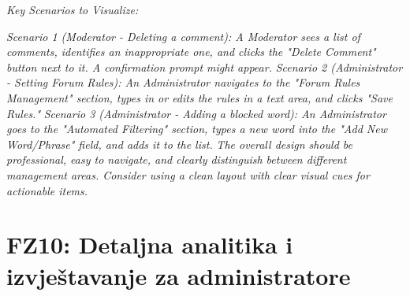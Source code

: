 \begin{enumerate}[itemsep=1ex]
    \textit{Key Scenarios to Visualize:}
    
    \textit{Scenario 1 (Moderator - Deleting a comment): A Moderator sees a list of comments, identifies an inappropriate one, and clicks the "Delete Comment" button next to it. A confirmation prompt might appear.}
    \textit{Scenario 2 (Administrator - Setting Forum Rules): An Administrator navigates to the "Forum Rules Management" section, types in or edits the rules in a text area, and clicks "Save Rules."}
    \textit{Scenario 3 (Administrator - Adding a blocked word): An Administrator goes to the "Automated Filtering" section, types a new word into the "Add New Word/Phrase" field, and adds it to the list.}
    \textit{The overall design should be professional, easy to navigate, and clearly distinguish between different management areas. Consider using a clean layout with clear visual cues for actionable items.}

\end{enumerate}
\sloppy  

\sloppy  
\section{FZ10: Detaljna analitika i izvještavanje za administratore}  

\sloppy  
